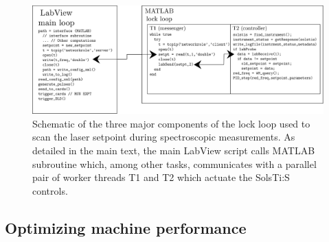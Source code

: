 	\begin{figure}
		\centering
		\includegraphics[width=\textwidth]{fig/apparatus/lock_loop}
		\caption{Schematic of the three major components of the lock loop used to scan the laser setpoint during spectroscopic measurements. As detailed in the main text, the main LabView script calls MATLAB subroutine which, among other tasks, communicates with a parallel pair of worker threads T1 and T2 which actuate the SolsTi:S controls.}
		\label{fig:tcp_control}
	\end{figure}











\subsection*{Optimizing machine performance}

